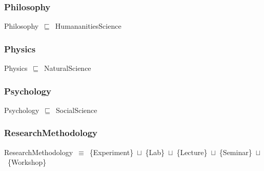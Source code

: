 \documentclass{article}
\begin{document}
\subsubsection*{Philosophy}

Philosophy~\ensuremath{\sqsubseteq}~HumananitiesScience~

\subsubsection*{Physics}

Physics~\ensuremath{\sqsubseteq}~NaturalScience~

\subsubsection*{Psychology}

Psychology~\ensuremath{\sqsubseteq}~SocialScience~

\subsubsection*{ResearchMethodology}

ResearchMethodology~\ensuremath{\equiv}~\{Experiment\}~\ensuremath{\sqcup}~\{Lab\}~\ensuremath{\sqcup}~\{Lecture\}~\ensuremath{\sqcup}~\{Seminar\}~\ensuremath{\sqcup}~\{Workshop\}
\end{document}
